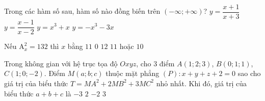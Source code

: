 \begin{ex}%
Trong các hàm số sau, hàm số nào đồng biến trên $(-\infty; + \infty)$?
	\choice
	{$y = \dfrac{x + 1}{x + 3}$}
	{$y = \dfrac{x - 1}{x - 2}$}
	{\True $y = x^3 + x$}
	{$y= - x^3 - 3x$}
\end{ex}

\begin{ex}%
Nếu $\mathrm{A}^2_x = 132$ thì $x$ bằng 
	\choice
	{$11$}
	{$0$}
	{\True $12$}
	{$11$ hoặc $10$}
\end{ex}

\begin{ex}%
Trong không gian với hệ trục tọa độ $Oxyz$, cho 3 điểm $A(1; 2; 3)$, $B(0; 1; 1)$, $C(1; 0; - 2)$. Điểm $M(a; b; c)$ thuộc mặt phẳng $(P) \colon x + y + z + 2=  0$ sao cho giá trị của biểu thức $T = MA^2 + 2MB^2 + 3MC^2$ nhỏ nhất. Khi đó, giá trị của biểu thức $a+ b + c$ là
	\choice
	{$-3$}
	{$2$}
	{\True $-2$}
	{$3$}
\end{ex}
